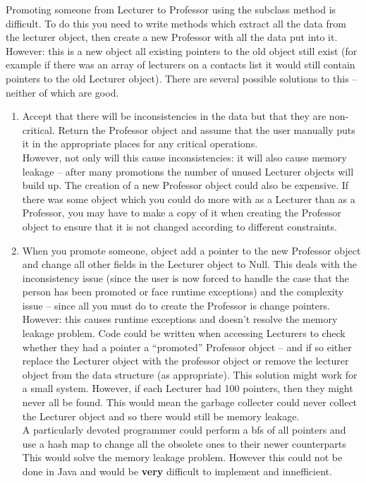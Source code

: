 \documentclass[10pt,\jkfside,a4paper]{article}
\begin{document}
Promoting someone from Lecturer to Professor using the subclass method is 
difficult. To do this you need to write methods which extract all the data from the lecturer object, then 
create a new Professor with all the data put into it. However: this is a new object all existing pointers 
to the old object still exist (for example if there was an array of lecturers on a contacts list it would 
still contain pointers to the old Lecturer object). There are several possible solutions to this -- neither 
of which are good.
\begin{enumerate}

\item Accept that there will be inconsistencies in the data but that they are non-critical. Return the 
Professor object and assume that the user manually puts it in the appropriate places for any critical operations.\\
However, not only will this cause inconsistencies: it will also cause memory leakage -- after many promotions 
the number of unused Lecturer objects will build up. The creation of a new Professor object could also be expensive. 
If there was some object which you could do more with as a Lecturer than as a Professor, you may have to make a copy 
of it when creating the Professor object to ensure that it is not changed according to different constraints.

\item When you promote someone, object add a pointer to the new Professor object
and change all other fields in the Lecturer object to Null. This deals with the inconsistency issue (since the user is 
now forced to handle the case that the person has been promoted or face runtime exceptions) and the 
complexity issue -- since all you must do to create the Professor is change pointers. However: this causes 
runtime exceptions and doesn't resolve the memory leakage problem. 
Code could be written when accessing Lecturers to check whether they had a 
pointer a ``promoted'' Professor object -- and if so either replace the Lecturer object with the professor object or remove 
the lecturer object from the data structure (as appropriate). 
This solution might work for a small system. However, if each Lecturer had 100 pointers,
then they might never all be found. This would mean the garbage collecter could never collect the Lecturer object 
and so there would still be memory leakage.\\
A particularly devoted programmer could perform a bfs of all pointers and use a hash map to 
change all the obsolete ones to their newer counterparts This would solve the memory leakage problem. However this could 
not be done in Java and would be \textbf{very} difficult to implement and innefficient.

\end{enumerate}
\end{document}
